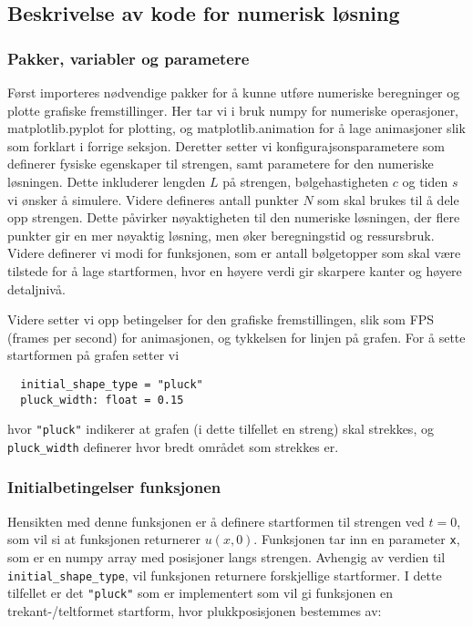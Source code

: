 \subsection{Beskrivelse av kode for numerisk løsning}
\subsubsection{Pakker, variabler og parametere}
Først importeres nødvendige pakker for å kunne utføre numeriske beregninger og plotte grafiske fremstillinger. Her
tar vi i bruk numpy for numeriske operasjoner, matplotlib.pyplot for plotting, og matplotlib.animation for å lage 
animasjoner slik som forklart i forrige seksjon. Deretter setter vi konfigurajsonsparametere som definerer
fysiske egenskaper til strengen, samt parametere for den numeriske løsningen. Dette inkluderer lengden $L$ på strengen,
bølgehastigheten $c$ og tiden $s$ vi ønsker å simulere. Videre defineres antall punkter $N$ som skal brukes til å dele 
opp strengen. Dette påvirker nøyaktigheten til den numeriske løsningen, der flere punkter gir en mer nøyaktig løsning,
men øker beregningstid og ressursbruk. Videre definerer vi modi for funksjonen, som er antall bølgetopper som skal være 
tilstede for å lage startformen, hvor en høyere verdi gir skarpere kanter og høyere detaljnivå. \parencite{bølgeSimulering}

Videre setter vi opp betingelser for den grafiske fremstillingen, slik som FPS (frames per second) for animasjonen, og
tykkelsen for linjen på grafen. For å sette startformen på grafen setter vi 

\begin{verbatim}
  initial_shape_type = "pluck"
  pluck_width: float = 0.15
\end{verbatim}

hvor \verb|"pluck"| indikerer at grafen (i dette tilfellet en streng) skal strekkes, og \verb|pluck_width| definerer hvor bredt området som strekkes er.

\subsubsection{Initialbetingelser funksjonen}
Hensikten med denne funksjonen er å definere startformen til strengen ved $t=0$, som vil si at funksjonen returnerer $u(x,0)$.
Funksjonen tar inn en parameter \verb|x|, som er en numpy array med posisjoner langs strengen. Avhengig av verdien til
\verb|initial_shape_type|, vil funksjonen returnere forskjellige startformer. I dette tilfellet er det \verb|"pluck"| 
som er implementert som vil gi funksjonen en trekant-/teltformet startform, hvor plukkposisjonen bestemmes av:

